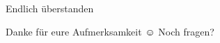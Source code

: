 \begin{frame}[plain]{Endlich überstanden}
 \begin{block}{Danke für eure Aufmerksamkeit $\smiley $}
 \huge Noch fragen?
 \end{block}
\end{frame}